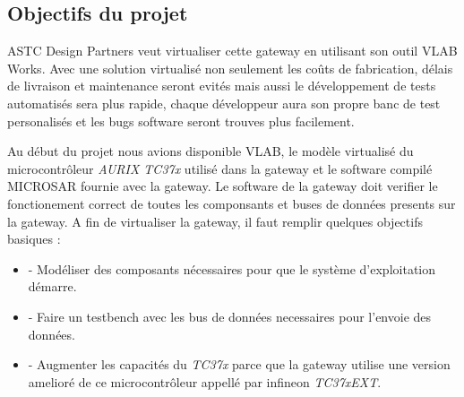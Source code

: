 \subsection{Objectifs du projet}

ASTC Design Partners veut virtualiser cette gateway en utilisant son outil VLAB Works. Avec une solution virtualis\'e non seulement les coûts de fabrication, délais de livraison et maintenance seront evit\'es mais aussi le développement de tests automatis\'es sera plus rapide, chaque développeur aura son propre banc de test personalis\'es et les bugs software seront trouves plus facilement. 


Au début du projet nous avions disponible VLAB, le mod\`ele virtualis\'e du microcontr\^oleur \textit{AURIX TC37x} utilis\'e dans la gateway et le software compil\'e MICROSAR fournie avec la gateway. Le software de la gateway doit verifier le fonctionement correct de toutes les componsants et buses de donn\'ees presents sur la gateway. A fin de virtualiser la gateway, il faut remplir quelques objectifs basiques : 
\begin{itemize}
    \item - Modéliser des composants nécessaires pour que le syst\`eme d'exploitation démarre.
    \item - Faire un testbench avec les bus de donn\'ees necessaires pour l'envoie des donn\'ees.
    \item - Augmenter les capacit\'es du \textit{TC37x} parce que la gateway utilise une version amelior\'e de ce microcontr\^oleur appell\'e par infineon \textit{TC37xEXT}.
\end{itemize}